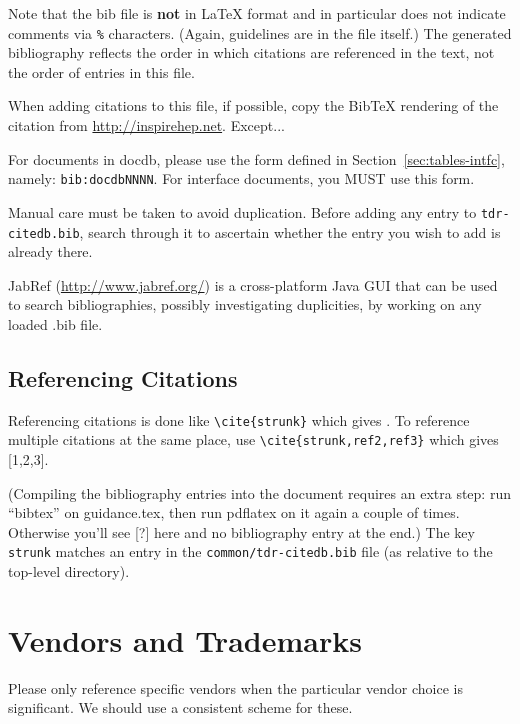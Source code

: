Note that the bib file is \textbf{not} in \LaTeX{} format and in particular does not
indicate comments via \texttt{\%} characters. (Again, guidelines are in the file itself.)
The
generated bibliography reflects the order in which citations are referenced in the text, not the order of entries in this file.

When adding citations to this file, if possible, copy the BibTeX rendering of the citation from \url{http://inspirehep.net}.  Except...

For documents in docdb, please use the form defined in Section~\ref{sec:tables-intfc}, namely: \verb|bib:docdbNNNN|. For interface documents, you MUST use this form.

Manual care must be taken to avoid duplication. %
Before adding any entry to \texttt{tdr-citedb.bib}, search through it
to ascertain whether the entry you wish to add is already there.

JabRef (\url{http://www.jabref.org/}) is a cross-platform Java GUI that can be used to search bibliographies, possibly investigating duplicities, by working on any loaded .bib file.

\subsection{Referencing Citations}
\label{sec:latex-ref}

Referencing citations is done like \verb|\cite{strunk}| which gives \cite{strunk}.
To reference multiple citations at the same place, use \verb|\cite{strunk,ref2,ref3}| which gives  [1,2,3].

(Compiling the bibliography entries into the document requires an extra step: run ``bibtex'' on
 guidance.tex, then run pdflatex on it again a couple of times. Otherwise you'll see [?] here 
 and no bibliography entry at the end.) 
The key \texttt{strunk} matches an entry in the \texttt{common/tdr-citedb.bib}
file (as relative to the top-level directory).

\section{Vendors and Trademarks}
\label{sec:trademarks}

Please only reference specific vendors when the particular vendor choice is significant. 
We should use a consistent scheme for these. 
 
